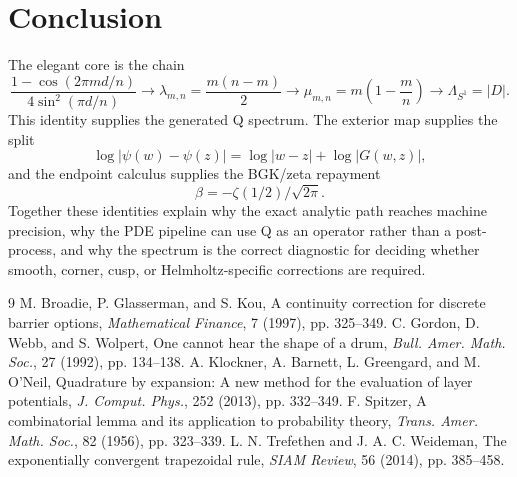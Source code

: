 \documentclass[10pt,leqno]{article}
\numberwithin{equation}{section}
\theoremstyle{plain}
\theoremstyle{definition}
\theoremstyle{remark}
\newcommand{\Lam}{\Lambda}
\begin{document}
\section{Conclusion}
The elegant core is the chain
\[
\frac{1-\cos(2\pi md/n)}{4\sin^2(\pi d/n)}
\longrightarrow
\lambda_{m,n}=\frac{m(n-m)}{2}
\longrightarrow
\mu_{m,n}=m\left(1-\frac mn\right)
\longrightarrow
\Lam_{S^1}=|D|.
\]
This identity supplies the generated Q spectrum.  The exterior map supplies the split
\[
\log|\psi(w)-\psi(z)|=\log|w-z|+\log|G(w,z)|,
\]
and the endpoint calculus supplies the BGK/zeta repayment
\[
\beta=-\zeta(1/2)/\sqrt{2\pi}.
\]
Together these identities explain why the exact analytic path reaches machine precision, why the PDE pipeline can use Q as an operator rather than a post-process, and why the spectrum is the correct diagnostic for deciding whether smooth, corner, cusp, or Helmholtz-specific corrections are required.

\begin{thebibliography}{9}
M. Broadie, P. Glasserman, and S. Kou, A continuity correction for discrete barrier options, \emph{Mathematical Finance}, 7 (1997), pp. 325--349.
C. Gordon, D. Webb, and S. Wolpert, One cannot hear the shape of a drum, \emph{Bull. Amer. Math. Soc.}, 27 (1992), pp. 134--138.
A. Klockner, A. Barnett, L. Greengard, and M. O'Neil, Quadrature by expansion: A new method for the evaluation of layer potentials, \emph{J. Comput. Phys.}, 252 (2013), pp. 332--349.
F. Spitzer, A combinatorial lemma and its application to probability theory, \emph{Trans. Amer. Math. Soc.}, 82 (1956), pp. 323--339.
L. N. Trefethen and J. A. C. Weideman, The exponentially convergent trapezoidal rule, \emph{SIAM Review}, 56 (2014), pp. 385--458.
\end{thebibliography}
\end{document}
